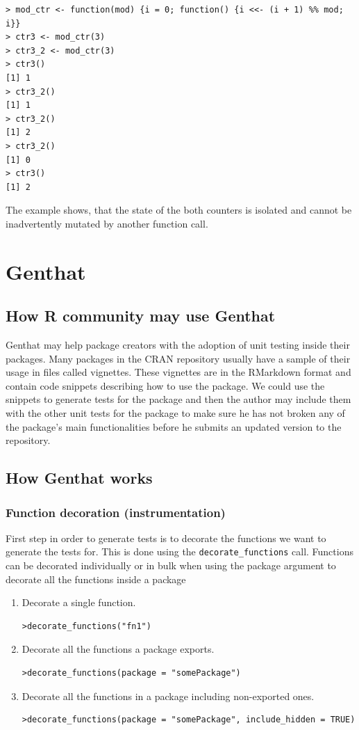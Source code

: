 \documentclass[thesis=B,english]{FITthesis}[2012/10/20]
\begin{document}
\begin{verbatim}
> mod_ctr <- function(mod) {i = 0; function() {i <<- (i + 1) %% mod; i}}
> ctr3 <- mod_ctr(3)
> ctr3_2 <- mod_ctr(3)
> ctr3()
[1] 1
> ctr3_2()
[1] 1
> ctr3_2()
[1] 2
> ctr3_2()
[1] 0
> ctr3()
[1] 2
\end{verbatim}

The example shows, that the state of the both counters is isolated and cannot be inadvertently mutated by another function call.

\chapter{Genthat} \label{chap:genthat}
\section{How R community may use Genthat}
Genthat may help package creators with the adoption of unit testing inside their packages. Many packages in the CRAN repository usually have a sample of their usage in files called vignettes. These vignettes are in the RMarkdown format and contain code snippets describing how to use the package. We could use the snippets to generate tests for the package and then the author may include them with the other unit tests for the package to make sure he has not broken any of the package’s main functionalities before he submits an updated version to the repository.

\section{How Genthat works}
\subsection{Function decoration (instrumentation)}
First step in order to generate tests is to decorate the functions we want to generate the tests for. This is done using the \verb|decorate_functions| call. Functions can be decorated individually or in bulk when using the package argument to decorate all the functions inside a package

\begin{enumerate}
\item Decorate a single function.
\begin{verbatim}
>decorate_functions("fn1")
\end{verbatim}
\item Decorate all the functions a package exports.
\begin{verbatim}
>decorate_functions(package = "somePackage")
\end{verbatim}
\item Decorate all the functions in a package including non-exported ones.
\begin{verbatim}
>decorate_functions(package = "somePackage", include_hidden = TRUE)
\end{verbatim}
\end{enumerate}
\end{document}
